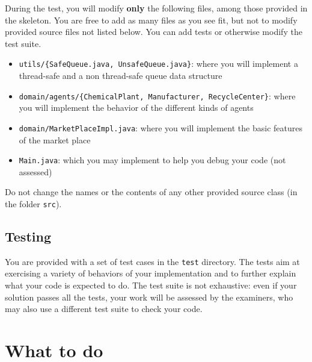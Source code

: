 \documentclass[a4wide,11pt]{article}
\renewcommand{\j}[1]{\texttt{#1}}
\begin{document}
During the test, you will modify \textbf{only} the following files, among those
provided in the skeleton. You are free to add as many files as you see fit,
but not to modify provided source files not listed below. You can add tests or
otherwise modify the test suite.

\begin{itemize}
	\item \j{utils/\{SafeQueue.java, UnsafeQueue.java\}}: where you will implement
a thread-safe and a non thread-safe queue data structure
	\item \j{domain/agents/\{ChemicalPlant, Manufacturer, RecycleCenter\}}: where
you
will implement the behavior of the different kinds of agents
	\item \j{domain/MarketPlaceImpl.java}: where you will implement the basic
features of the  market place
	\item \j{Main.java}: which you may implement to help you debug your code (not
assessed)
\end{itemize}

Do not change the names or the contents of any other provided source class
(in the folder \j{src}).

\subsection*{Testing}

You are provided with a set of test cases in the \j{test} directory. The tests
aim at exercising a variety of behaviors of your implementation and to further
explain what your code is expected to do. The test suite is not exhaustive:
even if your solution passes all the tests, your work will be assessed by the
examiners, who may also use a different test suite to check your code. 


\section*{What to do}
\end{document}
